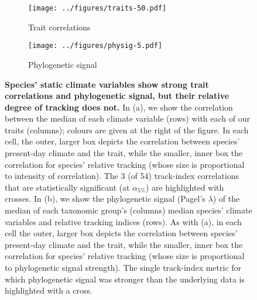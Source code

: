 \documentclass[12pt]{report}
\begin{document}
\clearpage
\begin{figure}[h!]
  \begin{center}
    \begin{subfigure}{.45\textwidth}
      \texttt{[image: ../figures/traits-50.pdf]}
      \caption{Trait correlations}
    \end{subfigure}
    \begin{subfigure}{.45\textwidth}
      \texttt{[image: ../figures/physig-5.pdf]}
      \caption{Phylogenetic signal}
    \end{subfigure}
  \end{center}
  \caption{\doublespacing \textbf{Species' static climate variables
      show strong trait correlations and phylogenetic signal, but
      their relative degree of tracking does not.} In (a), we show the
    correlation between the median of each climate variable (rows)
    with each of our traits (columns); colours are given at the right
    of the figure. In each cell, the outer, larger box depicts the
    correlation between species' present-day climate and the trait,
    while the smaller, inner box the correlation for species' relative
    tracking (whose size is proportional to intensity of
    correlation). The 3 (of 54) track-index correlations that are
    statistically significant (at $\alpha_{5\%}$) are highlighted with
    crosses. In (b), we show the phylogenetic signal (Pagel's
    $\lambda$\supercite{Pagel1999}) of the median of each taxonomic
    group's (columns) median species' climate variables and relative
    tracking indices (rows). As with (a), in each cell the outer,
    larger box depicts the correlation between species' present-day
    climate and the trait, while the smaller, inner box the
    correlation for species' relative tracking (whose size is
    proportional to phylogenetic signal strength). The single
    track-index metric for which phylogenetic signal was stronger than
    the underlying data is highlighted with a cross.}
  \label{traits}
\end{figure}
\end{document}
